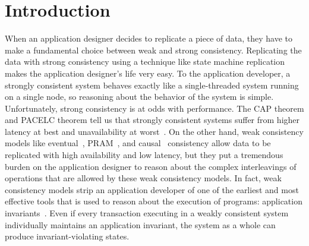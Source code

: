 \section{Introduction}
When an application designer decides to replicate a piece of data, they have to
make a fundamental choice between weak and strong consistency. Replicating the
data with strong consistency using a technique like state machine
replication~\cite{schneider1990implementing, lamport1998part,
liskov2012viewstamped, ongaro2014search} makes the application designer's life
very easy. To the application developer, a strongly consistent system behaves
exactly like a single-threaded system running on a single node, so reasoning
about the behavior of the system is simple. Unfortunately, strong consistency
is at odds with performance. The CAP theorem and PACELC theorem tell us that
strongly consistent systems suffer from higher latency at best and
unavailability at worst~\cite{brewer2012cap, abadi2012consistency}. On the
other hand, weak consistency models like eventual~\cite{vogels2009eventually},
PRAM~\cite{lipton1988pram}, and causal~\cite{ahamad1995causal} consistency
allow data to be replicated with high availability and low latency, but they
put a tremendous burden on the application designer to reason about the complex
interleavings of operations that are allowed by these weak consistency models.
In fact, weak consistency models strip an application developer of one of the
earliest and most effective tools that is used to reason about the execution of
programs: application invariants~\cite{hoare1969axiomatic}. Even if every
transaction executing in a weakly consistent system individually maintains an
application invariant, the system as a whole can produce invariant-violating
states.


